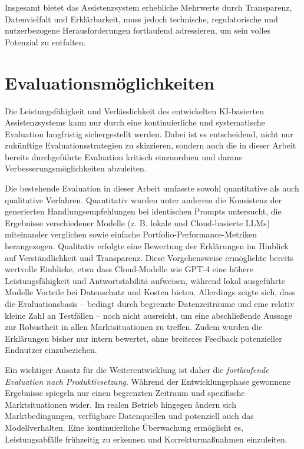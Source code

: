     Insgesamt bietet das Assistenzsystem erhebliche Mehrwerte durch Transparenz, Datenvielfalt und Erklärbarkeit, muss jedoch technische, regulatorische und nutzerbezogene Herausforderungen fortlaufend adressieren, um sein volles Potenzial zu entfalten.


  \section{Evaluationsmöglichkeiten}

    Die Leistungsfähigkeit und Verlässlichkeit des entwickelten \acs{KI}-basierten Assistenzsystems kann nur durch eine kontinuierliche und systematische Evaluation langfristig sichergestellt werden.
    Dabei ist es entscheidend, nicht nur zukünftige Evaluationsstrategien zu skizzieren, sondern auch die in dieser Arbeit bereits durchgeführte Evaluation kritisch einzuordnen und daraus Verbesserungsmöglichkeiten abzuleiten.

    Die bestehende Evaluation in dieser Arbeit umfasste sowohl quantitative als auch qualitative Verfahren.
    Quantitativ wurden unter anderem die Konsistenz der generierten Handlungsempfehlungen bei identischen Prompts untersucht, die Ergebnisse verschiedener Modelle (z. B. lokale und Cloud-basierte \acs{LLM}s) miteinander verglichen sowie einfache Portfolio-Performance-Metriken herangezogen.
    Qualitativ erfolgte eine Bewertung der Erklärungen im Hinblick auf Verständlichkeit und Transparenz.
    Diese Vorgehensweise ermöglichte bereits wertvolle Einblicke, etwa dass Cloud-Modelle wie GPT-4 eine höhere Leistungsfähigkeit und Antwortstabilitä aufweisen, während lokal ausgeführte Modelle Vorteile bei Datenschutz und Kosten bieten.
    Allerdings zeigte sich, dass die Evaluationsbasis -- bedingt durch begrenzte Datenzeiträume und eine relativ kleine Zahl an Testfällen -- noch nicht ausreicht, um eine abschließende Aussage zur Robustheit in allen Marktsituationen zu treffen.
    Zudem wurden die Erklärungen bisher nur intern bewertet, ohne breiteres Feedback potenzieller Endnutzer einzubeziehen.

    Ein wichtiger Ansatz für die Weiterentwicklung ist daher die \emph{fortlaufende Evaluation nach Produktivsetzung}.
    Während der Entwicklungsphase gewonnene Ergebnisse spiegeln nur einen begrenzten Zeitraum und spezifische Marktsituationen wider.
    Im realen Betrieb hingegen ändern sich Marktbedingungen, verfügbare Datenquellen und potenziell auch das Modellverhalten.
    Eine kontinuierliche Überwachung ermöglicht es, Leistungsabfälle frühzeitig zu erkennen und Korrekturmaßnahmen einzuleiten.


